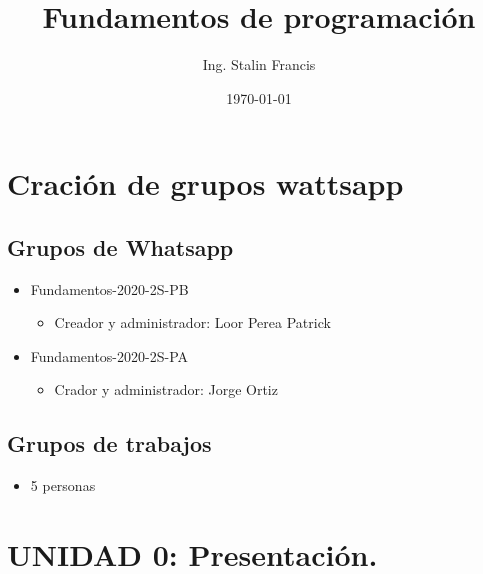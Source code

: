 \documentclass[presentation, aspectratio=54]{beamer}
\author{Ing. Stalin Francis}
\date{\today}
\title{Fundamentos de programación}
\begin{document}
\maketitle
\tableofcontents




\section{Cración de grupos wattsapp}
\label{sec:org99596ee}
\subsection{Grupos de Whatsapp}
\label{sec:orge79de66}
\begin{itemize}
\item Fundamentos-2020-2S-PB
\begin{itemize}
\item Creador y administrador: Loor Perea Patrick
\end{itemize}
\item Fundamentos-2020-2S-PA
\begin{itemize}
\item Crador y administrador: Jorge Ortiz
\end{itemize}
\end{itemize}
\subsection{Grupos de trabajos}
\label{sec:org728121f}
\begin{itemize}
\item 5 personas
\end{itemize}

\section{UNIDAD 0: Presentación.}
\label{sec:org8c4c838}
\end{document}
